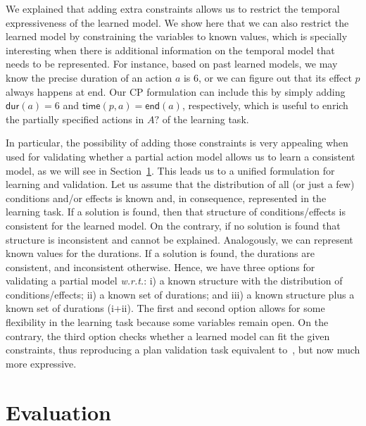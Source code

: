 \documentclass[10pt,journal,compsoc]{IEEEtran}
\newcommand{\dur}{\mathsf{dur}}    %
\newcommand{\en}{\mathsf{end}}     %
\newcommand{\tim}{\mathsf{time}}   %
\begin{document}
We explained that adding extra constraints allows us to restrict the temporal expressiveness of the learned model. We show here that we can also restrict the learned model by constraining the variables to known values, which is specially interesting when there is additional information on the temporal model that needs to be represented. For instance, based on past learned models, we may know the precise duration of an action $a$ is 6,
or we can figure out that its effect $p$ always happens at end.
Our CP formulation can include this by simply adding $\dur(a)=6$ and $\tim(p,a)=\en(a)$, respectively, which is useful to enrich the partially specified actions in $A?$ of the learning task.

In particular, the possibility of adding those constraints is very appealing when used for validating whether a partial action model allows us to learn a consistent model, as we will see in Section~\ref{sec:evaluation}. This leads us to a unified formulation for learning and validation.
Let us assume that the distribution of all (or just a few) conditions and/or effects is known and, in consequence, represented in the learning task. If a solution is found, then that structure of conditions/effects is consistent for the learned model. On the contrary, if no solution is found that structure is inconsistent and cannot be explained.
Analogously, we can represent known values for the durations. If a solution is found, the durations are consistent, and inconsistent otherwise.
Hence, we have three options for validating a partial model \emph{w.r.t.}: i) a known structure with the distribution of conditions/effects; ii) a known set of durations; and iii) a known structure plus a known set of durations (i+ii).
The first and second option allows for some flexibility in the learning task because some variables remain open. On the contrary, the third option checks whether a learned model can fit the given constraints, thus reproducing a plan validation task equivalent to~\cite{howey2004val}, but now much more expressive.



\section{Evaluation}
\label{sec:evaluation}
\end{document}
